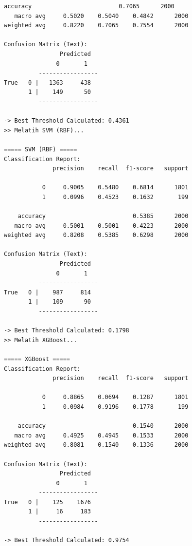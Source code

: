 \begin{lstlisting}[caption={Output 4}]
    accuracy                         0.7065      2000
   macro avg     0.5020    0.5040    0.4842      2000
weighted avg     0.8220    0.7065    0.7554      2000

Confusion Matrix (Text):
                Predicted
               0       1
          -----------------
True   0 |   1363     438
       1 |    149      50
          -----------------

-> Best Threshold Calculated: 0.4361
>> Melatih SVM (RBF)...

===== SVM (RBF) =====
Classification Report:
              precision    recall  f1-score   support

           0     0.9005    0.5480    0.6814      1801
           1     0.0996    0.4523    0.1632       199

    accuracy                         0.5385      2000
   macro avg     0.5001    0.5001    0.4223      2000
weighted avg     0.8208    0.5385    0.6298      2000

Confusion Matrix (Text):
                Predicted
               0       1
          -----------------
True   0 |    987     814
       1 |    109      90
          -----------------

-> Best Threshold Calculated: 0.1798
>> Melatih XGBoost...

===== XGBoost =====
Classification Report:
              precision    recall  f1-score   support

           0     0.8865    0.0694    0.1287      1801
           1     0.0984    0.9196    0.1778       199

    accuracy                         0.1540      2000
   macro avg     0.4925    0.4945    0.1533      2000
weighted avg     0.8081    0.1540    0.1336      2000

Confusion Matrix (Text):
                Predicted
               0       1
          -----------------
True   0 |    125    1676
       1 |     16     183
          -----------------

-> Best Threshold Calculated: 0.9754
\end{lstlisting}

